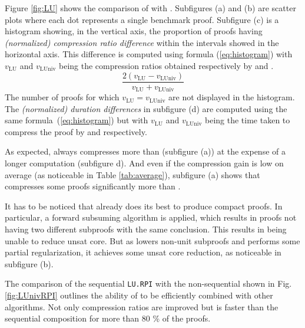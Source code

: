 \documentclass{llncs}
\begin{document}
\newcommand{\va}[1]{\ensuremath{v_{\text{#1}}}}

Figure \ref{fig:LU} shows the comparison of {\LowerUnits} with {\LowerUnivalents}. Subfigures (a) and (b) are scatter plots where each dot represents a single benchmark proof. 
Subfigure (c) is a histogram showing, in the vertical axis, the proportion of proofs having \emph{(normalized) compression ratio difference} within the intervals showed in the horizontal axis. This difference is computed using formula (\ref{eq:histogram}) with \va{LU}
and \va{LUniv} being the compression ratios obtained respectively by {\LowerUnits} and
{\LowerUnivalents}.
\begin{equation} \label{eq:histogram}
  \frac { 2(\va{LU} - \va{LUniv}) }{ \va{LU} + \va{LUniv} }
\end{equation}
The number of proofs for which $\va{LU} = \va{LUniv}$ are not displayed in the histogram.
The \emph{(normalized) duration differences} in subfigure (d) are computed using the same formula~(\ref{eq:histogram}) but
with \va{LU} and \va{LUniv} being the time taken to compress the proof by {\LowerUnits} and
{\LowerUnits} respectively.



As expected, {\LowerUnivalents} always compresses more than {\LowerUnits} (subfigure (a)) at the expense of a longer
computation (subfigure d). And even if the compression gain is low on average (as noticeable in Table \ref{tab:average}), subfigure (a) shows that {\LowerUnivalents} compresses some proofs significantly more than {\LowerUnits}.

It has to be noticed that \veriT already does its best to produce compact proofs. In particular,
a forward subsuming algorithm is applied, which results in proofs not having two different subproofs
with the same conclusion. This results in {\LowerUnits} being unable to reduce unsat core.
But as {\LowerUnivalents} lowers non-unit subproofs and performs some partial regularization, it
achieves some unsat core reduction, as noticeable in subfigure (b).

The comparison of the sequential \texttt{LU.RPI} with the non-sequential {\LUnivRPI} shown in Fig.
\ref{fig:LUnivRPI} outlines the ability of {\LowerUnivalents} to be efficiently combined with other
algorithms. Not only compression ratios are improved but {\LUnivRPI} is faster than the sequential
composition for more than 80 \% of the proofs.




\end{document}
